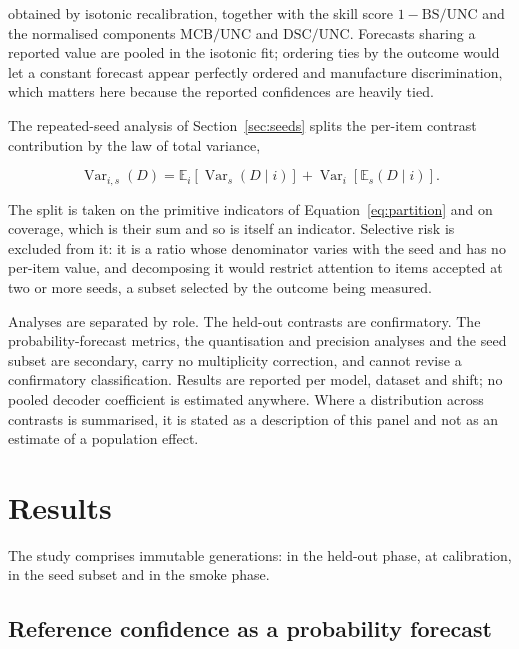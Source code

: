 \documentclass[information,article,submit,moreauthors]{Definitions/mdpi}
\begin{document}
\noindent
obtained by isotonic recalibration, together with the skill score
$1-\mathrm{BS}/\mathrm{UNC}$ and the normalised components
$\mathrm{MCB}/\mathrm{UNC}$ and $\mathrm{DSC}/\mathrm{UNC}$. Forecasts sharing a
reported value are pooled in the isotonic fit; ordering ties by the outcome
would let a constant forecast appear perfectly ordered and manufacture
discrimination, which matters here because the reported confidences are heavily
tied.

The repeated-seed analysis of Section~\ref{sec:seeds} splits the per-item
contrast contribution by the law of total variance,

\begin{equation}
\operatorname{Var}_{i,s}(D)
= \mathbb{E}_i\!\left[\operatorname{Var}_s(D \mid i)\right]
+ \operatorname{Var}_i\!\left[\mathbb{E}_s(D \mid i)\right].
\label{eq:lotv}
\end{equation}

\noindent
The split is taken on the primitive indicators of
Equation~\eqref{eq:partition} and on coverage, which is their sum and so is
itself an indicator. Selective risk is excluded from it: it is a ratio whose
denominator varies with the seed and has no per-item value, and decomposing it
would restrict attention to items accepted at two or more seeds, a subset
selected by the outcome being measured.

Analyses are separated by role. The held-out contrasts are confirmatory. The
probability-forecast metrics, the quantisation and precision analyses and the
seed subset are secondary, carry no multiplicity correction, and cannot revise a
confirmatory classification. Results are reported per model, dataset and shift;
no pooled decoder coefficient is estimated anywhere. Where a distribution across
contrasts is summarised, it is stated as a description of this panel and not as
an estimate of a population effect.

\section{Results}
\label{sec:results}

The study comprises \NumTotalRecords{} immutable generations:
\NumHeldOutRecords{} in the held-out phase, \NumCalibrationRecords{} at
calibration, \NumSeedRecords{} in the seed subset and \NumSmokeRecords{} in the
smoke phase.

\subsection{Reference confidence as a probability forecast}
\label{sec:refquality}
\end{document}
